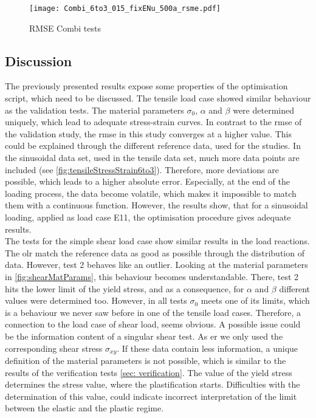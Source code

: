\begin{figure}[H]
    \centering
    \texttt{[image: Combi\_6to3\_015\_fixENu\_500a\_rsme.pdf]}
    \caption{RMSE Combi tests}
    \label{fig:combiRMSE}
\end{figure}

\subsection{Discussion}
The previously presented results expose some properties of the optimisation script, which need to be discussed. The tensile load case showed similar behaviour as the validation tests. The material parameters $\sigma_0$, $\alpha$ and $\beta$ were determined uniquely, which lead to adequate stress-strain curves. In contrast to the \acrshort{rmse} of the validation study, the \acrshort{rmse} in this study converges at a higher value. This could be explained through the different reference data, used for the studies. In the sinusoidal data set, used in the tensile data set, much more data points are included (see \autoref{fig:tensileStressStrain6to3}).
Therefore, more deviations are possible, which leads to a higher absolute error. Especially, at the end of the loading process, the data become volatile, which makes it impossible to match them with a continuous function. However, the results show, that for a sinusoidal loading, applied as load case E11, the optimisation procedure gives adequate results. \\
The tests for the simple shear load case show similar results in the load reactions.
The \acrlong{olr} match the reference data as good as possible through the distribution of data.
However, test 2 behaves like an outlier. Looking at the material parameters in \autoref{fig:shearMatParams}, this behaviour becomes understandable. There, test 2 hits the lower limit of the yield stress, and as a consequence, for $\alpha$ and $\beta$ different values were determined too. However, in all tests $\sigma_0$ meets one of its limits, which is a behaviour we never saw before in one of the tensile load cases.
Therefore, a connection to the load case of shear load, seems obvious.
A possible issue could be the information content of a singular shear test. As \acrlong{er} we only used the corresponding shear stress $\sigma_{xy}$. If these data contain less information, a unique definition of the material parameters is not possible, which is similar to the results of the verification tests \autoref{sec: verification}. The value of the yield stress determines the stress value, where the plastification starts. Difficulties with the determination of this value, could indicate incorrect interpretation of the limit between the elastic and the plastic regime.
